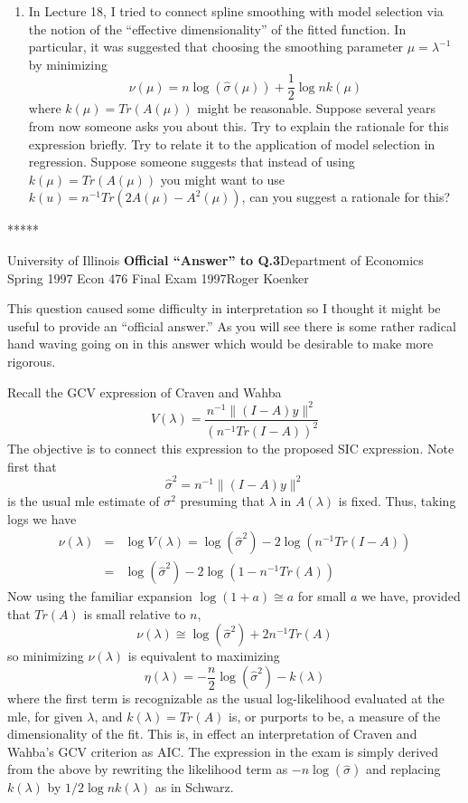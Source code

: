 \begin{enumerate}
\item In Lecture 18, I tried to connect spline smoothing with model selection 
via the notion of the ``effective dimensionality'' of the fitted function.
In particular, it was suggested that choosing the smoothing parameter 
$\mu=\lambda^{-1} $ by minimizing
\[
\nu(\mu) = n \log (\hat{\sigma} (\mu)) + \frac{1}{2} \log n k(\mu)
\]
where $k(\mu) = Tr (A(\mu))$ might be reasonable.  Suppose several years
from now someone asks you about this.  Try to explain the rationale 
for this expression briefly.  Try to relate it to the application of model
selection in regression.  Suppose someone suggests that instead of using
$k(\mu) = Tr (A(\mu))$ you might want to use $k(u)= n^{-1}Tr (2A(\mu) - 
A^2 (\mu))$, can you suggest a rationale for this?
\end{enumerate}


\vspace{10mm}
\begin{center}
*****
\end{center}

\noindent
University of Illinois \hfill\large{{\bf Official ``Answer'' to Q.3}}\hfill Department of Economics \\
Spring 1997 \hfill \large{{Econ 476 Final Exam 1997}}\hfill Roger Koenker


\vspace{15mm}

This question caused some difficulty in interpretation so I thought it 
might be useful to provide an ``official answer.''  As you will see
there is some rather radical hand waving going on in this answer which 
would be desirable to make more rigorous.

Recall the GCV expression of Craven and Wahba
\[
V(\lambda) = \frac{n^{-1} \parallel (I-A)y\parallel^2}{(n^{-1} Tr (I-A))^2}
\]
The objective is to connect this expression to the proposed SIC expression.
Note first that
\[
\hat \sigma^2 = n^{-1} \parallel (I-A)y\parallel^2
\]
is the usual mle estimate of $\sigma^2$ presuming that $\lambda $ in
$A(\lambda)$ is fixed.  Thus, taking logs we have
\begin{eqnarray*}
\nu(\lambda) &=&  \log V(\lambda) = \log (\hat \sigma^2) - 2 \log (n^{-1} Tr (I-A))\\
&=& \log (\hat \sigma^2 ) -  2 \log (1 - n^{-1} Tr (A))
\end{eqnarray*}
Now using the familiar expansion $\log (1+a) \cong a $ for small $a$ we have,
provided that $Tr(A)$ is small relative to $n$,
\[
\nu(\lambda) \cong \log (\hat\sigma^2) + 2n^{-1} Tr (A)
\]
so minimizing $\nu(\lambda)$ is equivalent to maximizing
\[
\eta (\lambda) = - \frac{n}{2} \log (\hat \sigma^2) - k(\lambda)
\]
where the first term is recognizable as the usual log-likelihood 
evaluated at the mle, for given $\lambda$, and $k(\lambda) = Tr(A)$ is, 
or purports to be, a measure of the dimensionality of the fit.
This is, in effect an interpretation of Craven and Wahba's GCV criterion as 
AIC.  The expression in the exam is simply derived from the above by 
rewriting the likelihood term as $-n\log (\hat\sigma)$ and 
replacing $k(\lambda)$ by $1/2 \log n k(\lambda)$ as in Schwarz.

